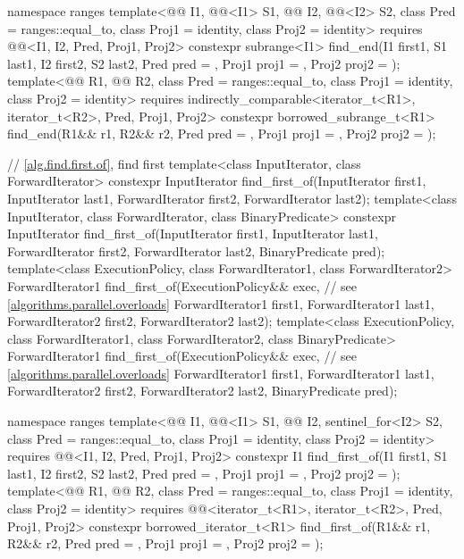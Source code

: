 \begin{codeblock}
{  namespace ranges {
    template<@@ I1, @@<I1> S1, @@ I2, @@<I2> S2,
             class Pred = ranges::equal_to, class Proj1 = identity, class Proj2 = identity>
      requires @@<I1, I2, Pred, Proj1, Proj2>
      constexpr subrange<I1>
        find_end(I1 first1, S1 last1, I2 first2, S2 last2, Pred pred = {},
                 Proj1 proj1 = {}, Proj2 proj2 = {});
    template<@@ R1, @@ R2,
             class Pred = ranges::equal_to, class Proj1 = identity, class Proj2 = identity>
      requires indirectly_comparable<iterator_t<R1>, iterator_t<R2>, Pred, Proj1, Proj2>
      constexpr borrowed_subrange_t<R1>
        find_end(R1&& r1, R2&& r2, Pred pred = {},
                 Proj1 proj1 = {}, Proj2 proj2 = {});
  }

  // \ref{alg.find.first.of}, find first
  template<class InputIterator, class ForwardIterator>
    constexpr InputIterator
      find_first_of(InputIterator first1, InputIterator last1,
                    ForwardIterator first2, ForwardIterator last2);
  template<class InputIterator, class ForwardIterator, class BinaryPredicate>
    constexpr InputIterator
      find_first_of(InputIterator first1, InputIterator last1,
                    ForwardIterator first2, ForwardIterator last2,
                    BinaryPredicate pred);
  template<class ExecutionPolicy, class ForwardIterator1, class ForwardIterator2>
    ForwardIterator1
      find_first_of(ExecutionPolicy&& exec,                     // see \ref{algorithms.parallel.overloads}
                    ForwardIterator1 first1, ForwardIterator1 last1,
                    ForwardIterator2 first2, ForwardIterator2 last2);
  template<class ExecutionPolicy, class ForwardIterator1,
           class ForwardIterator2, class BinaryPredicate>
    ForwardIterator1
      find_first_of(ExecutionPolicy&& exec,                     // see \ref{algorithms.parallel.overloads}
                    ForwardIterator1 first1, ForwardIterator1 last1,
                    ForwardIterator2 first2, ForwardIterator2 last2,
                    BinaryPredicate pred);

  namespace ranges {
    template<@@ I1, @@<I1> S1, @@ I2, sentinel_for<I2> S2,
             class Pred = ranges::equal_to, class Proj1 = identity, class Proj2 = identity>
      requires @@<I1, I2, Pred, Proj1, Proj2>
      constexpr I1 find_first_of(I1 first1, S1 last1, I2 first2, S2 last2,
                                 Pred pred = {},
                                 Proj1 proj1 = {}, Proj2 proj2 = {});
    template<@@ R1, @@ R2,
             class Pred = ranges::equal_to, class Proj1 = identity, class Proj2 = identity>
      requires @@<iterator_t<R1>, iterator_t<R2>, Pred, Proj1, Proj2>
      constexpr borrowed_iterator_t<R1>
        find_first_of(R1&& r1, R2&& r2,
                      Pred pred = {},
                      Proj1 proj1 = {}, Proj2 proj2 = {});
  }

}
\end{codeblock}

